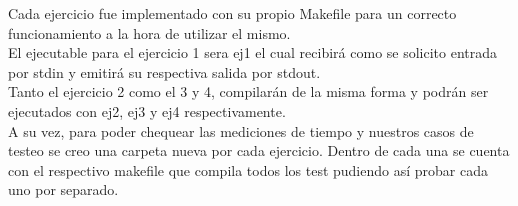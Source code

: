 Cada ejercicio fue implementado con su propio Makefile para un correcto funcionamiento a la hora de utilizar el mismo.\\
El ejecutable para el ejercicio 1 sera ej1 el cual recibir\'a como se solicito entrada por stdin y emitir\'a su respectiva salida por stdout.\\
Tanto el ejercicio 2 como el 3 y 4, compilar\'an de la misma forma y podr\'an ser ejecutados con ej2, ej3 y ej4 respectivamente.\\
A su vez, para poder chequear las mediciones de tiempo y nuestros casos de testeo se creo una carpeta nueva por cada ejercicio. Dentro de cada una se cuenta con el respectivo makefile que compila todos los test pudiendo as\'i probar cada uno por separado.